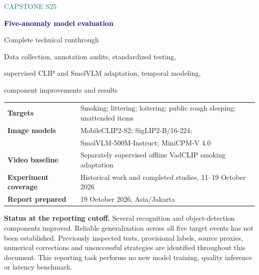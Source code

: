 \documentclass[11pt,a4paper,oneside]{report}
\begin{document}
\hypersetup{pageanchor=false}
\begin{titlepage}
\centering
\vspace*{18mm}
{\Large\textcolor{teal}{CAPSTONE S25}\par}
\vspace{12mm}
{\Huge\bfseries\textcolor{navy}{Five-anomaly model evaluation}\par}
\vspace{8mm}
{\LARGE Complete technical runthrough\par}
\vspace{9mm}
{\large Data collection, annotation audits, standardized testing,\par supervised CLIP and SmolVLM adaptation, temporal modeling,\par component improvements and results\par}
\vspace{15mm}
\begin{tabularx}{\linewidth}{@{}lX@{}}
\textbf{Targets} & Smoking; littering; loitering; public rough sleeping; unattended items\\[5pt]
\textbf{Image models} & MobileCLIP2-S2; SigLIP2-B/16-224;\\
& SmolVLM-500M-Instruct; MiniCPM-V 4.0\\[5pt]
\textbf{Video baseline} & Separately supervised offline VadCLIP smoking adaptation\\[5pt]
\textbf{Experiment coverage} & Historical work and completed studies, 11--19 October 2026\\[5pt]
\textbf{Report prepared} & 19 October 2026, Asia/Jakarta
\end{tabularx}
\vfill
\begin{minipage}{0.91\linewidth}
\textbf{Status at the reporting cutoff.} Several recognition and object-detection components improved. Reliable generalization across all five target events has not been established. Previously inspected tests, provisional labels, source proxies, numerical corrections and unsuccessful strategies are identified throughout this document. This reporting task performs no new model training, quality inference or latency benchmark.
\end{minipage}
\vspace{12mm}
\end{titlepage}
\hypersetup{pageanchor=true}

\tableofcontents
\listoftables
\listoffigures
\clearpage
{}













\appendix

\end{document}
